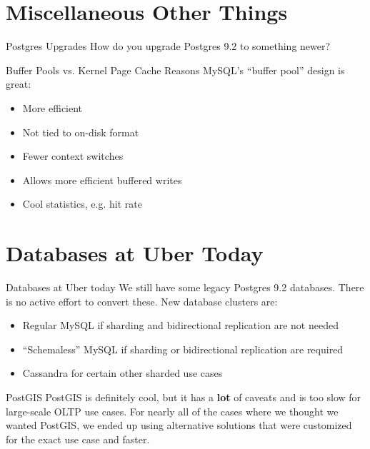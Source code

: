 \documentclass[14pt]{beamer}
\begin{document}
\section{Miscellaneous Other Things}

\begin{frame}{Postgres Upgrades}
  How do you upgrade Postgres 9.2 to something newer?
\end{frame}

\begin{frame}{Buffer Pools vs. Kernel Page Cache}
  Reasons MySQL's ``buffer pool'' design is great:
  \begin{itemize}
  \item More efficient
    \item Not tied to on-disk format
  \item Fewer context switches
  \item Allows more efficient buffered writes
  \item Cool statistics, e.g. hit rate
  \end{itemize}
\end{frame}

\section{Databases at Uber Today}

\begin{frame}{Databases at Uber today}
  We still have some legacy Postgres 9.2 databases. There is no active effort to
  convert these.
  \newline
  \newline
  New database clusters are:
  \begin{itemize}
  \item Regular MySQL if sharding and bidirectional replication are not
    needed
  \item ``Schemaless'' MySQL if sharding or bidirectional replication are
    required
    \item Cassandra for certain other sharded use cases
  \end{itemize}
\end{frame}

\begin{frame}{PostGIS}
  PostGIS is definitely cool, but it has a \textbf{lot} of caveats and is too
  slow for large-scale OLTP use cases.
  \newline
  \newline
  For nearly all of the cases where we thought we wanted PostGIS, we ended up
  using alternative solutions that were customized for the exact use case and
  faster.
\end{frame}
\end{document}
